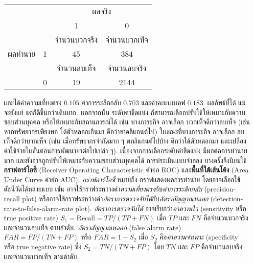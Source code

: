 \begin{Exercise}
\begin{center}
\begin{tabular}{cccc}
		&       & \multicolumn{2}{c}{ผลจริง} \\
		&       & 1              &   0      \\
		\cline{3-4}        
		&       & \multicolumn{1}{|c}{จำนวนบวกจริง} & \multicolumn{1}{|c|}{จำนวนบวกเท็จ}  \\
		ผลทำนาย   &     1 & \multicolumn{1}{|c}{45} & \multicolumn{1}{|c|}{384} \\
		\cline{3-4}
		&      & \multicolumn{1}{|c}{จำนวนลบเท็จ} & \multicolumn{1}{|c|}{จำนวนลบจริง} \\
		&     0 & \multicolumn{1}{|c}{19} & \multicolumn{1}{|c|}{2144} \\         
		\cline{3-4}
	\end{tabular} 
\end{center}
%
และได้ค่าความเที่ยงตรง $0.105$ ค่าการระลึกกลับ $0.703$ และค่าคะแนนเอฟ $0.183$.
ผลลัพธ์ที่ได้ แม้จะยังแย่ แต่ก็ดีขึ้นกว่าเดิมมาก.
นอกจากนั้น
ระดับค่าขีดแบ่ง ก็สามารถเลือกปรับใช้ให้เหมาะกับความชอบส่วนบุคคล หรือให้เหมาะกับสถานการณ์ได้ 
เช่น บางภาระกิจ อาจเลือก บวกเท็จดีกว่าลบเท็จ (เช่น หากทรัพยากรเพียงพอ ได้ตัวหลอกเกินมา ดีกว่าขาดลิแกนต์ไป) 
ในขณะที่บางภาระกิจ อาจเลือก ลบเท็จดีกว่าบวกเท็จ (เช่น เมื่อทรัพยากรจำกัดมาก ๆ ตกลิแกนต์ไปบ้าง ดีกว่าได้ตัวหลอกมา และเปลืองค่าใช้จ่ายในขั้นตอนการพัฒนายาต่อไปเปล่า ๆ).
เนื่องจากการเลือกระดับค่าขีดแบ่ง มีผลต่อการทำนายมาก 
และยังอาจถูกปรับให้เหมาะกับความชอบส่วนบุคคลได้
การประเมินแบบจำลอง บางครั้งจึงนิยมใช้\textbf{กราฟอาร์โอซี} (Receiver Operating Characteristic คำย่อ ROC) และ\textbf{พื้นที่ใต้เส้นโค้ง} (Area Under Curve คำย่อ AUC).
\textit{กราฟอาร์โอซี}
%
หมายถึง กราฟแสดงผลการทำนาย โดยอาจเลือกใช้ดัชนีวัดได้หลายแบบ
เช่น
อาจใช้กราฟระหว่างค่า\textit{ความเที่ยงตรง}กับ\textit{ค่าการระลึกกลับ} (precision-recall plot)
หรืออาจใช้กราฟระหว่างค่า\textit{อัตราการตรวจจับได้}กับ\textit{อัตราสัญญาณหลอก} (detection-rate-to-false-alarm-rate plot).
\textit{อัตราการตรวจจับได้} อาจเรียกว่า\textit{ค่าความไว}
(sensitivity หรือ true positive rate)  $S_1 = \mathrm{Recall} = TP/(TP + FN)$
เมื่อ $TP$ และ $FN$ คือจำนวนบวกจริง และจำนวนลบเท็จ ตามลำดับ.
\textit{อัตราสัญญาณหลอก} (false alarm rate) $FAR = FP/(TN + FP)$
หรือ $FAR = 1 - S_2$
เมื่อ $S_2$ คือ\textit{ค่าความจำเพาะ} (specificity หรือ true negative rate) ซึ่ง $S_2 = TN/(TN + FP)$
โดย $TN$ และ $FP$ คือจำนวนลบจริง และจำนวนบวกเท็จ ตามลำดับ.


\end{Exercise}
